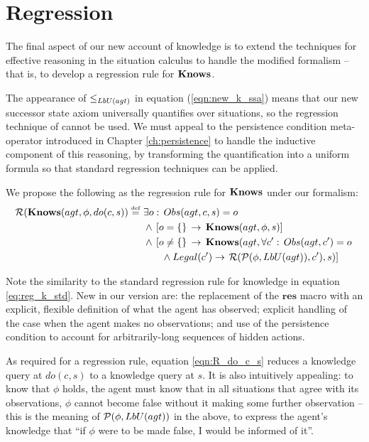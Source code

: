 \section{Regression\label{sec:Knowledge:Regression}}

The final aspect of our new account of knowledge is to extend the
techniques for effective reasoning in the situation calculus to handle
the modified formalism -- that is, to develop a regression rule for
$\mathbf{Knows}$.

The appearance of $\leq_{LbU(agt)}$ in equation (\ref{eqn:new_k_ssa})
means that our new successor state axiom universally quantifies over
situations, so the regression technique of \citep{scherl03sc_knowledge}
cannot be used. We must appeal to the persistence condition meta-operator
introduced in Chapter \ref{ch:persistence} to handle the inductive
component of this reasoning, by transforming the quantification into
a uniform formula so that standard regression techniques can be applied.

We propose the following as the regression rule for $\mathbf{Knows}$ under
our formalism:\begin{align}
\mathcal{R}(\mathbf{Knows}(agt,\phi,do(c,s))\stackrel{\mbox{\tiny def}}{=}\,\, & \exists o:\, Obs(agt,c,s)=o\nonumber \\
 & \wedge\,\left[o=\{\}\,\rightarrow\,\mathbf{Knows}(agt,\phi,s)\right]\nonumber \\
 & \wedge\,\left[o\neq\{\}\,\rightarrow\,\mathbf{Knows}(agt,\forall c':\, Obs(agt,c')=o\right.\nonumber \\
 & \,\,\,\,\,\,\,\,\,\,\,\wedge Legal(c')\rightarrow\left.\mathcal{R}(\mathcal{P}(\phi,LbU(agt)),c'),s)\right]\label{eqn:R_do_c_s}\end{align}


Note the similarity to the standard regression rule for knowledge
in equation \eqref{eq:reg_k_std}. New in our version are: the replacement
of the $\mathbf{res}$ macro with an explicit, flexible definition
of what the agent has observed; explicit handling of the case when
the agent makes no observations; and use of the persistence condition
to account for arbitrarily-long sequences of hidden actions.

As required for a regression rule, equation \eqref{eqn:R_do_c_s}
reduces a knowledge query at $do(c,s)$ to a knowledge query at $s$.
It is also intuitively appealing: to know that $\phi$ holds, the
agent must know that in all situations that agree with its observations,
$\phi$ cannot become false without it making some further observation
-- this is the meaning of $\mathcal{P}(\phi,LbU(agt))$ in the above, to
express the agent's knowledge that {}``if $\phi$ were to be made
false, I would be informed of it''.

